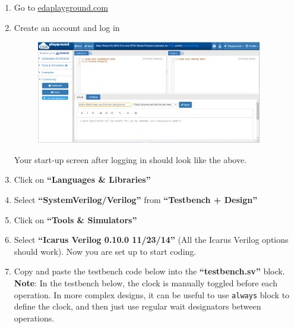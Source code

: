 \begin{enumerate}
    \item Go to \href{edaplayground.com}{edaplayground.com}
    \item Create an account and log in
        \begin{figure}[H]
            \centering
            \includegraphics[width=0.75\columnwidth,height=4.5cm]{Figures/homeScreen.png}
            \label{fig: home}
        \end{figure}
    Your start-up screen after logging in should look like the above.    
    \item Click on \textbf{“Languages \& Libraries”}
    \item Select \textbf{“SystemVerilog/Verilog”} from \textbf{“Testbench + Design”}
    \item Click on \textbf{“Tools \& Simulators”}
    \item Select \textbf{“Icarus Verilog 0.10.0 11/23/14”} (All the Icarus Verilog options should work).
    Now you are set up to start coding.
    \item Copy and paste the testbench code below into the \textbf{“testbench.sv”} block.\\
    \textbf{Note}: In the testbench below, the clock is manually toggled before each operation. In more complex designs, it can be useful to use \verb|always| block to define the clock, and then just use regular wait designators between operations.
    
    

\end{enumerate}
